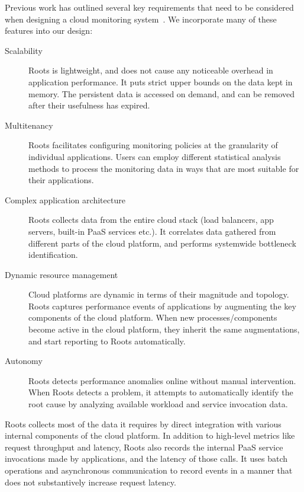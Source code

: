 Previous work has outlined several key requirements that need to be considered when
designing a cloud monitoring system~\cite{DaCunhaRodrigues:2016:MCC:2851613.2851619,Ibidunmoye:2015:PAD:2808687.2791120}. 
We incorporate many of these features into our design:
\begin{description}
\item[Scalability] Roots is lightweight, and does not cause any noticeable overhead in 
application performance. It puts strict upper bounds on the data kept in memory. 
The persistent data is accessed on demand, and can be removed after their usefulness has expired.
\item[Multitenancy] Roots facilitates configuring monitoring policies at the granularity of individual applications.
Users can employ different statistical analysis methods to process the monitoring data in ways that are 
most suitable for their applications.
\item[Complex application architecture] Roots collects data from the entire cloud stack 
(load balancers, app servers, built-in PaaS services etc.). It correlates data gathered
from different parts of the cloud platform, and performs systemwide bottleneck identification.
\item[Dynamic resource management] Cloud platforms are dynamic in terms of their magnitude 
and topology. Roots captures performance events of applications by augmenting 
the key components of the cloud platform. When new processes/components become active
in the cloud platform, they inherit the same augmentations, and start reporting to Roots automatically.
\item[Autonomy] Roots detects performance anomalies online without manual intervention.
When Roots detects a problem, it attempts to automatically identify the root cause by analyzing
available workload and service invocation data.
\end{description}

Roots collects most of the data it requires by direct integration with various internal components 
of the cloud platform. In addition to high-level metrics like request throughput
and latency, Roots also records the internal PaaS service invocations made by applications,
and the latency of those calls. It uses batch operations and asynchronous 
communication to record events in a manner that does not substantively
increase request latency.

